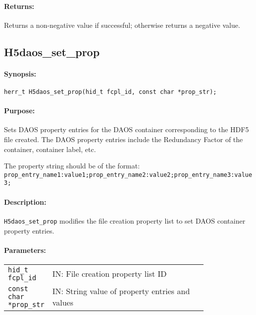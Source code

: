 \documentclass[../users_guide.tex]{subfiles}
\begin{document}
\paragraph{Returns:}
\begin{flushleft}%
Returns a non-negative value if successful; otherwise returns a negative value.
\end{flushleft}%

\newpage
\subsection{H5daos\_set\_prop}
\label{ref:h5daos_set_prop}

\paragraph{Synopsis:}
\begin{flushleft}%
\begin{verbatim}
herr_t H5daos_set_prop(hid_t fcpl_id, const char *prop_str);
\end{verbatim}
\end{flushleft}%

\paragraph{Purpose:}
\begin{flushleft}%
Sets DAOS property entries for the DAOS container corresponding to the HDF5 file created. The DAOS
property entries include the Redundancy Factor of the container, container label, etc.

The property string should be of the format: 
\texttt{prop\_entry\_name1:value1;prop\_entry\_name2:value2;prop\_entry\_name3:value3;}

\end{flushleft}%

\paragraph{Description:}
\begin{flushleft}%
\texttt{H5daos\_set\_prop} modifies the file creation property list to set DAOS
container property entries.
\end{flushleft}%

\paragraph{Parameters:}
\begin{flushleft}%
 \begin{tabular}{lp{0.8\linewidth}}%
   \texttt{hid\_t fcpl\_id} & IN: File creation property list ID \\
   \texttt{const char *prop\_str} & IN: String value of property entries and values\\
 \end{tabular}%
\end{flushleft}%
\end{document}
